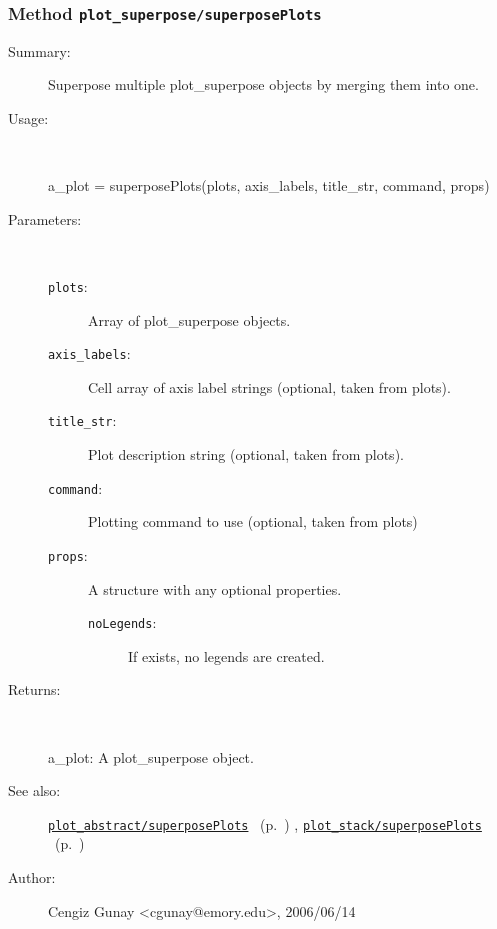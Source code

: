 \subsubsection[Method \texttt{superposePlots}]{Method \texttt{plot\_superpose/superposePlots}}%
%
\label{ref_plot_superpose__superposePlots}%
\hypertarget{ref_plot_superpose__superposePlots}{}%
\begin{description}
\item[Summary:]Superpose multiple plot\_superpose objects by merging them into one.
%
\item[Usage:]~%
\begin{lyxcode}%
a\_plot = superposePlots(plots, axis\_labels, title\_str, command, props)
%
\end{lyxcode}%
%
%
\item[Parameters:]~
\begin{description}%
\item[\texttt{plots}:]
 Array of plot\_superpose objects.
\item[\texttt{axis\_labels}:]
 Cell array of axis label strings (optional, taken from plots).
\item[\texttt{title\_str}:]
 Plot description string (optional, taken from plots).
\item[\texttt{command}:]
 Plotting command to use (optional, taken from plots)
\item[\texttt{props}:]
 A structure with any optional properties.
\begin{description}%
\item[\texttt{noLegends}:]
 If exists, no legends are created.
\end{description}%
\end{description}%
%
\item[Returns:
]~

	a\_plot: A plot\_superpose object.
%
%
\item[See also:]%
\hyperlink{ref_plot_abstract__superposePlots}{\texttt{plot\_abstract/superposePlots}}%
\ (p.~\pageref{ref_plot_abstract__superposePlots})%
%
, \hyperlink{ref_plot_stack__superposePlots}{\texttt{plot\_stack/superposePlots}}%
\ (p.~\pageref{ref_plot_stack__superposePlots})%
%
%
\item[Author:]%
Cengiz Gunay <cgunay@emory.edu>, 2006/06/14
%
\end{description}
\methodline%
